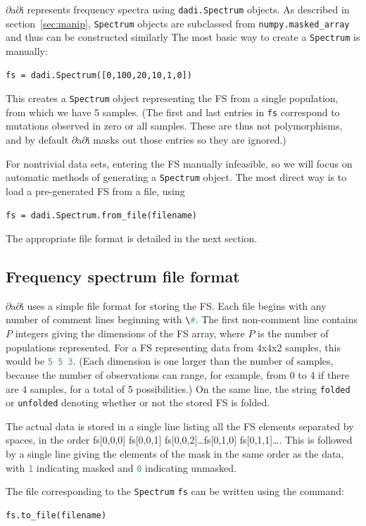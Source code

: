 \documentclass[12pt]{article}
\makeatletter
\newcommand{\dadi}{$\partial$a$\partial$i\xspace}
\newcommand{\py}[1]{\lstinline[language=Python, showstringspaces=False]@#1@}
\makeatother
\begin{document}
\dadi represents frequency spectra using \py{dadi.Spectrum} objects.
As described in section~\ref{sec:manip}, \py{Spectrum} objects are subclassed from \py{numpy.masked_array} and thus can be constructed similarly
The most basic way to create a \py{Spectrum} is manually:
\begin{lstlisting}
fs = dadi.Spectrum([0,100,20,10,1,0])
\end{lstlisting}
This creates a \py{Spectrum} object representing the FS from a single population, from which we have 5 samples.
(The first and last entries in \py{fs} correspond to mutations observed in zero or all samples. These are thus not polymorphisms, and by default \dadi masks out those entries so they are ignored.)

For nontrivial data sets, entering the FS manually infeasible, so we will focus on automatic methods of generating a \py{Spectrum} object.
The most direct way is to load a pre-generated FS from a file, using
\begin{lstlisting}
fs = dadi.Spectrum.from_file(filename)
\end{lstlisting}
The appropriate file format is detailed in the next section.

\subsection{Frequency spectrum file format}

\dadi uses a simple file format for storing the FS.
Each file begins with any number of comment lines beginning with \py{\#}.
The first non-comment line contains $P$ integers giving the dimensions of the FS array, where $P$ is the number of populations represented.
For a FS representing data from 4x4x2 samples, this would be \py{5 5 3}.
(Each dimension is one larger than the number of samples, because the number of observations can range, for example, from 0 to 4 if there are 4 samples, for a total of 5 possibilities.)
On the same line, the string \py{folded} or \py{unfolded} denoting whether or not the stored FS is folded.

The actual data is stored in a single line listing all the FS elements separated by spaces, in the order fs[0,0,0] fs[0,0,1] fs[0,0,2]\dots fs[0,1,0] fs[0,1,1]\dots.
This is followed by a single line giving the elements of the mask in the same order as the data, with \py{1} indicating masked and \py{0} indicating unmasked.

The file corresponding to the \py{Spectrum} \py{fs} can be written using the command:
\begin{lstlisting}
fs.to_file(filename)
\end{lstlisting}
\end{document}
